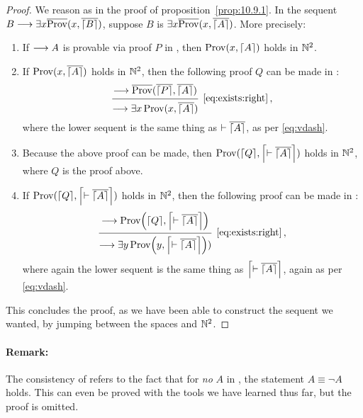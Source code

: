 \documentclass[11pt,a4paper]{article}
\begin{document}
\begin{proof}
    We reason as in the proof of proposition~\ref{prop:10.9.1}.
    In the sequent \(B\seq\exists x\num\Prov(x,\num{\G B})\),
    suppose \(B\) is \(\exists x\num\Prov(x,\num{\G A})\).
    More precisely:
    \begin{enumerate}
        \item
            If \(\seq A\) is provable via proof \(P\) in \PA,
            then \(\Prov(x,\G A)\) holds in \(\Nset^2\).
        \item
            If \(\Prov(x,\num{\G A})\) holds in \(\Nset^2\),
            then the following proof \(Q\) can be made in \PA:
            \begin{equation*}
                \begin{prooftree}
                    \hypo{\seq\num\Prov(\num{\G P},\num{\G A})}
                    \infer1[\eqref{eq:exists:right}]{\seq\exists x\Prov(x, \num{\G A})}
                \end{prooftree}\,,
            \end{equation*}
            where the lower sequent is the same thing as
            \(\vdash\num{\G{A}}\), as per \eqref{eq:vdash}.
        \item
            Because the above proof can be made,
            then \(\Prov(\G Q, \G*{\vdash\num{\G{A}}})\)
            holds in \(\Nset^2\), where \(Q\) is the proof above.
        \item
            If \(\Prov(\G Q, \G*{\vdash\num{\G{A}}})\) holds in \(\Nset^2\),
            then the following proof can be made in \PA:
            \begin{equation*}
                \begin{prooftree}
                    \hypo{\seq\Prov\arcs*{\G Q, \G*{\vdash\num{\G{A}}}}}
                    \infer1[\eqref{eq:exists:right}]{\seq\exists y\Prov\arcs*{y, \G*{\vdash\num{\G{A}}}})}
                \end{prooftree}\,,
            \end{equation*}
            where again the lower sequent is the same thing as
            \(\G*{\vdash\num{\G{A}}}\), again as per \eqref{eq:vdash}.
    \end{enumerate}
    This concludes the proof, as we have been able to construct the sequent we wanted,
    by jumping between the spaces \PA{} and \(\Nset^2\).
\end{proof}

\paragraph{Remark:}
The consistency of \PA{} refers to the fact that for \emph{no}
\(A\) in \LN, the statement \(A\equiv\lnot A\) holds.
This can even be proved with the tools we have learned
thus far, but the proof is omitted.
\end{document}
